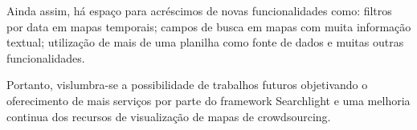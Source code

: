 Ainda assim, há espaço para acréscimos de novas funcionalidades  como: filtros por data em mapas temporais; campos de busca em mapas com muita informação textual; utilização de mais de uma planilha como fonte de dados e muitas outras funcionalidades.  

Portanto, vislumbra-se a possibilidade de trabalhos futuros objetivando o oferecimento de mais serviços por parte do framework Searchlight e uma melhoria continua dos recursos de visualização de mapas de crowdsourcing.
